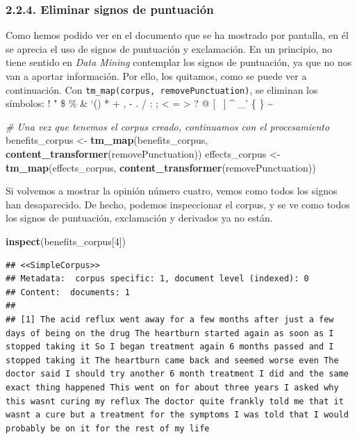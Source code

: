 \documentclass[spanish,]{article}
\newenvironment{Shaded}{\begin{snugshade}}{\end{snugshade}}
\newcommand{\KeywordTok}[1]{\textcolor[rgb]{0.13,0.29,0.53}{\textbf{#1}}}
\newcommand{\DecValTok}[1]{\textcolor[rgb]{0.00,0.00,0.81}{#1}}
\newcommand{\StringTok}[1]{\textcolor[rgb]{0.31,0.60,0.02}{#1}}
\newcommand{\CommentTok}[1]{\textcolor[rgb]{0.56,0.35,0.01}{\textit{#1}}}
\newcommand{\NormalTok}[1]{#1}
\begin{document}
\subsubsection{2.2.4. Eliminar signos de
puntuación}\label{eliminar-signos-de-puntuacion}

Como hemos podido ver en el documento que se ha mostrado por pantalla,
en él se aprecia el uso de signos de puntuación y exclamación. En un
principio, no tiene sentido en \textit{Data Mining} contemplar los
signos de puntuación, ya que no nos van a aportar información. Por ello,
los quitamos, como se puede ver a continuación. Con
\texttt{tm\_map(corpus,\ removePunctuation)}, se eliminan los símbolos:
! " \$ \% \& `() * + , - . / : ; \textless{} = \textgreater{} ? @ {[}
~{]} \^{} \_' \{ \textbar{} \} \textasciitilde{}

\begin{Shaded}
\begin{Highlighting}[]
\CommentTok{# Una vez que tenemos el corpus creado, continuamos con el procesamiento}
\NormalTok{benefits_corpus <-}\StringTok{ }\KeywordTok{tm_map}\NormalTok{(benefits_corpus, }\KeywordTok{content_transformer}\NormalTok{(removePunctuation))}
\NormalTok{effects_corpus <-}\StringTok{ }\KeywordTok{tm_map}\NormalTok{(effects_corpus, }\KeywordTok{content_transformer}\NormalTok{(removePunctuation))}
\end{Highlighting}
\end{Shaded}

Si volvemos a mostrar la opinión número cuatro, vemos como todos los
signos han desaparecido. De hecho, podemos inspeccionar el corpus, y se
ve como todos los signos de puntuación, exclamación y derivados ya no
están.

\begin{Shaded}
\begin{Highlighting}[]
\KeywordTok{inspect}\NormalTok{(benefits_corpus[}\DecValTok{4}\NormalTok{])}
\end{Highlighting}
\end{Shaded}

\begin{verbatim}
## <<SimpleCorpus>>
## Metadata:  corpus specific: 1, document level (indexed): 0
## Content:  documents: 1
## 
## [1] The acid reflux went away for a few months after just a few days of being on the drug The heartburn started again as soon as I stopped taking it So I began treatment again 6 months passed and I stopped taking it The heartburn came back and seemed worse even The doctor said I should try another 6 month treatment I did and the same exact thing happened This went on for about three years I asked why this wasnt curing my reflux The doctor quite frankly told me that it wasnt a cure but a treatment for the symptoms I was told that I would probably be on it for the rest of my life
\end{verbatim}
\end{document}
